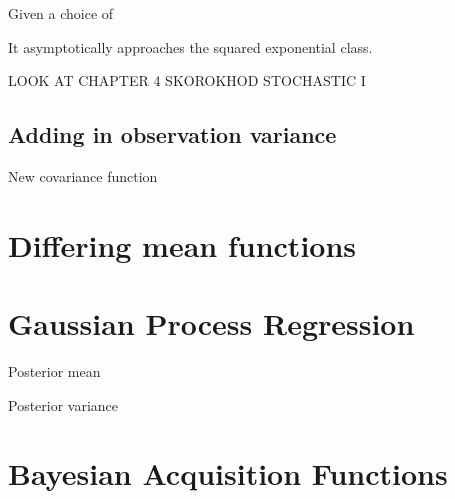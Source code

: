 Given a choice of


\begin{figure}
\end{figure}


\begin{figure}
\end{figure}

It asymptotically approaches the squared exponential class.

LOOK AT CHAPTER 4 SKOROKHOD STOCHASTIC I

\subsection*{Adding in observation variance}

\begin{figure}
\end{figure}

New covariance function

\section{Differing mean functions}



\begin{figure}
\end{figure}


\section{Gaussian Process Regression}

Posterior mean

Posterior variance

\section{Bayesian Acquisition Functions}

